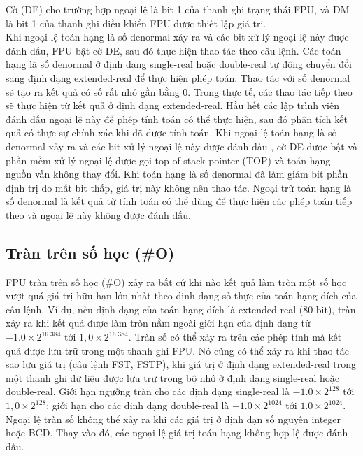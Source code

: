		Cờ (DE) cho trường hợp ngoại lệ là bit 1 của thanh ghi trạng thái FPU, và DM là bit 1 của thanh ghi điều khiển FPU được thiết lập giá trị.\\
		
		Khi ngoại lệ toán hạng là số denormal xảy ra và các bit xử lý ngoại lệ này được đánh dấu, FPU bật cờ DE, sau đó thực hiện thao tác theo câu lệnh. Các toán hạng là số denormal ở định dạng single-real hoặc double-real tự động chuyển đổi sang định dạng extended-real để thực hiện phép toán. Thao tác với số denormal sẽ tạo ra kết quả có số rất nhỏ gần bằng 0. Trong thực tế, các thao tác tiếp theo sẽ thực hiện từ kết quả ở định dạng extended-real. Hầu hết các lập trình viên đánh dấu ngoại lệ này để phép tính toán có thể thực hiện, sau đó phân tích kết quả có thực sự chính xác khi đã được tính toán.
Khi ngoại lệ toán hạng là số denormal xảy ra và các bit xử lý ngoại lệ này được đánh dấu , cờ DE được bật và phần mềm xử lý ngoại lệ được gọi top-of-stack pointer (TOP) và toán hạng nguồn vẫn không thay đổi. Khi toán hạng là số denormal đã làm giảm bit phần định trị do mất bit thấp, giá trị này không nên thao tác. Ngoại trừ toán hạng là số denormal là kết quả từ tính toán có thể dùng để thực hiện các phép toán tiếp theo và ngoại lệ này không được đánh dấu.

		\subsection*{Tràn trên số học (\#O)}
		FPU tràn trên số học (\#O) xảy ra bất cứ khi nào kết quả làm tròn một số học vượt quá giá trị hữu hạn lớn nhất theo định dạng số thực của toán hạng đích của câu lệnh. Ví dụ, nếu định dạng của toán hạng đích là extended-real (80 bit), tràn xảy ra khi kết quả được làm tròn nằm ngoài giới hạn của định dạng từ $-1.0 \times 2^{16.384}$ tới $1,0 \times 2^{16.384}$. Tràn số có thể xảy ra trên các phép tính mà kết quả được lưu trữ trong một thanh ghi FPU. Nó cũng có thể xảy ra khi thao tác sao lưu giá trị (câu lệnh FST, FSTP), khi giá trị ở định dạng extended-real trong một thanh ghi dữ liệu được lưu trữ trong bộ nhớ ở định dạng single-real hoặc double-real. Giới hạn ngưỡng tràn cho các định dạng single-real là $-1.0 \times 2^{128}$ tới $1,0 \times 2^{128}$; giới hạn cho các định dạng double-real là $-1.0 \times 2^{1024}$ tới $1.0 \times 2^{1024}$.\\
		
	Ngoại lệ tràn số không thể xảy ra khi các giá trị ở định dạn số nguyên integer hoặc BCD. Thay vào đó, các ngoại lệ giá trị toán hạng không hợp lệ được đánh dấu.\\
	
